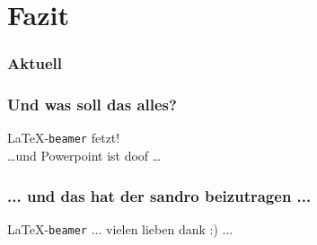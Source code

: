 \documentclass{beamer}
\begin{document}
\section{Fazit}

\begin{frame}
  \frametitle{Aktuell}
  \tableofcontents[currentsection]{}
\end{frame}

\begin{frame}
  \frametitle{Und was soll das alles?}

  \onslide<+->

  \begin{center}
    \LaTeX{}-\texttt{beamer} fetzt! \\
    \onslide<+->
    \dots und Powerpoint ist doof \dots
  \end{center}

\end{frame}

\begin{frame}
  \frametitle{... und das hat der sandro beizutragen ...}

  \begin{center}
    \LaTeX{}-\texttt{beamer} ... vielen lieben dank :) ...
  \end{center}

\end{frame}
\end{document}
